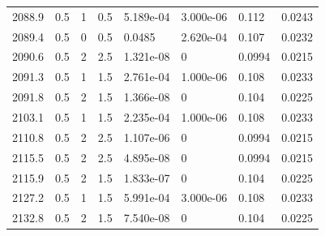 \documentclass[preview]{standalone}
\begin{document}
{{{{{{{\begin{tabular}{L{1.2cm}C{1.2cm} C{0.3cm}C{0.5cm} C{1.4cm}C{1.4cm} C{1.4cm}C{1.4cm}}
  2088.9  &   0.5  & 1     & 0.5 &  5.189e-04  & 3.000e-06  & 0.112 &  0.0243   \\ 
  2089.4  &   0.5  & 0     & 0.5 &  0.0485  & 2.620e-04  & 0.107 &  0.0232   \\ 
  2090.6  &   0.5  & 2     & 2.5 &  1.321e-08  & 0  & 0.0994 &  0.0215   \\ 
  2091.3  &   0.5  & 1     & 1.5 &  2.761e-04  & 1.000e-06  & 0.108 &  0.0233   \\ 
  2091.8  &   0.5  & 2     & 1.5 &  1.366e-08  & 0  & 0.104 &  0.0225   \\ 
  2103.1  &   0.5  & 1     & 1.5 &  2.235e-04  & 1.000e-06  & 0.108 &  0.0233   \\ 
  2110.8  &   0.5  & 2     & 2.5 &  1.107e-06  & 0  & 0.0994 &  0.0215   \\ 
  2115.5  &   0.5  & 2     & 2.5 &  4.895e-08  & 0  & 0.0994 &  0.0215   \\ 
  2115.9  &   0.5  & 2     & 1.5 &  1.833e-07  & 0  & 0.104 &  0.0225   \\ 
  2127.2  &   0.5  & 1     & 1.5 &  5.991e-04  & 3.000e-06  & 0.108 &  0.0233   \\ 
  2132.8  &   0.5  & 2     & 1.5 &  7.540e-08  & 0  & 0.104 &  0.0225   \\ 
\hline 
\end{tabular} 

}}}}}}}
\end{document}
